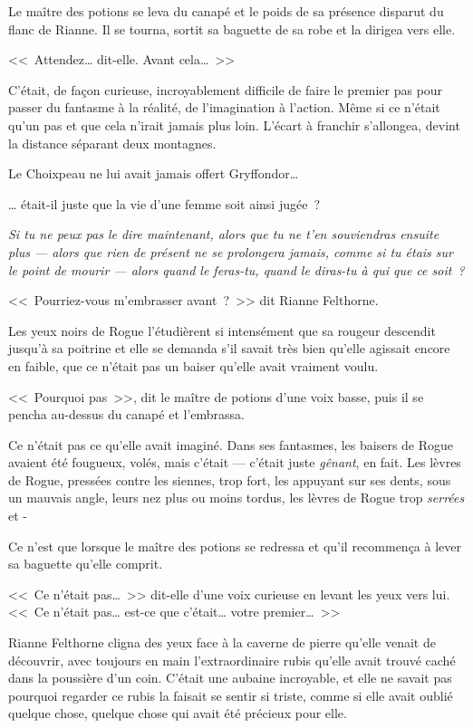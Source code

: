 Le maître des potions se leva du canapé et le poids de sa présence disparut du flanc de Rianne. Il se tourna, sortit sa baguette de sa robe et la dirigea vers elle.

<<~Attendez… dit-elle. Avant cela…~>>

C'était, de façon curieuse, incroyablement difficile de faire le premier pas pour passer du fantasme à la réalité, de l'imagination à l'action. Même si ce n'était qu'un pas et que cela n'irait jamais plus loin. L'écart à franchir s'allongea, devint la distance séparant deux montagnes.

Le Choixpeau ne lui avait jamais offert Gryffondor…

… était-il juste que la vie d'une femme soit ainsi jugée~?

\emph{Si tu ne peux pas le dire maintenant, alors que tu ne t'en souviendras ensuite plus — alors que rien de présent ne se prolongera jamais, comme si tu étais sur le point de mourir — alors quand le feras-tu, quand le diras-tu à qui que ce soit~?}

<<~Pourriez-vous m'embrasser avant~?~>> dit Rianne Felthorne.

Les yeux noirs de Rogue l'étudièrent si intensément que sa rougeur descendit jusqu'à sa poitrine et elle se demanda s'il savait très bien qu'elle agissait encore en faible, que ce n'était pas un baiser qu'elle avait vraiment voulu.

<<~Pourquoi pas~>>, dit le maître de potions d'une voix basse, puis il se pencha au-dessus du canapé et l'embrassa.

Ce n'était pas ce qu'elle avait imaginé. Dans ses fantasmes, les baisers de Rogue avaient été fougueux, volés, mais c'était — c'était juste \emph{gênant}, en fait. Les lèvres de Rogue, pressées contre les siennes, trop fort, les appuyant sur ses dents, sous un mauvais angle, leurs nez plus ou moins tordus, les lèvres de Rogue trop \emph{serrées} et -

Ce n'est que lorsque le maître des potions se redressa et qu'il recommença à lever sa baguette qu'elle comprit.

<<~Ce n'était pas…~>> dit-elle d'une voix curieuse en levant les yeux vers lui. <<~Ce n'était pas… est-ce que c'était… votre premier…~>>

Rianne Felthorne cligna des yeux face à la caverne de pierre qu'elle venait de découvrir, avec toujours en main l'extraordinaire rubis qu'elle avait trouvé caché dans la poussière d'un coin. C'était une aubaine incroyable, et elle ne savait pas pourquoi regarder ce rubis la faisait se sentir si triste, comme si elle avait oublié quelque chose, quelque chose qui avait été précieux pour elle.
